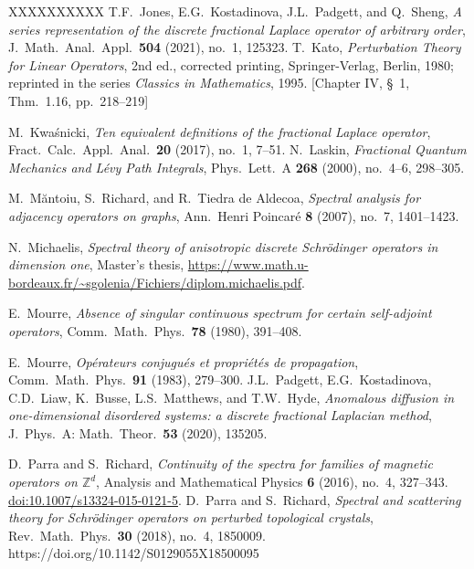 \documentclass[10pt]{amsart} %
\newcommand{\1}{{\mathbb{I}}}
\numberwithin{equation}{section}
\begin{document}
\begin{thebibliography}{XXXXXXXXXX}
 T.F.\ Jones, E.G.\ Kostadinova, J.L.\ Padgett, and Q.\ Sheng, \emph{A series representation of the discrete fractional Laplace operator of arbitrary order}, J.\ Math.\ Anal.\ Appl.\ {\bf 504} (2021), no.\ 1, 125323.
T.~Kato, \emph{Perturbation Theory for Linear Operators}, 2nd ed., corrected printing,
Springer-Verlag, Berlin, 1980; reprinted in the series \emph{Classics in Mathematics}, 1995.
[Chapter IV, \S~1, Thm.~1.16, pp.~218--219]

 M.\ Kwa\'{s}nicki, \emph{Ten equivalent definitions of the fractional Laplace operator}, Fract.\ Calc.\ Appl.\ Anal.\ {\bf 20} (2017), no.\ 1, 7--51.
 N.\ Laskin, \emph{Fractional Quantum Mechanics and L\'evy Path Integrals}, Phys.\ Lett.\ A {\bf 268} (2000), no.\ 4--6, 298--305.

 M.\ M\u{a}ntoiu, S.\ Richard, and R.\ Tiedra de Aldecoa, \emph{Spectral analysis for adjacency operators on graphs}, Ann.\ Henri Poincar\'e {\bf 8} (2007), no.\ 7, 1401--1423.

 N.\ Michaelis, \emph{Spectral theory of anisotropic discrete Schr\"odinger operators in dimension one}, Master's thesis, \url{https://www.math.u-bordeaux.fr/~sgolenia/Fichiers/diplom.michaelis.pdf}.

 E.\ Mourre, \emph{Absence of singular continuous spectrum for certain self-adjoint operators}, Comm.\ Math.\ Phys.\ {\bf 78} (1980), 391--408.

 E.\ Mourre, \emph{Op\'erateurs conjugu\'es et propri\'et\'es de propagation}, Comm.\ Math.\ Phys.\ {\bf 91} (1983), 279--300.
 J.L.\ Padgett, E.G.\ Kostadinova, C.D.\ Liaw, K.\ Busse, L.S.\ Matthews, and T.W.\ Hyde, \emph{Anomalous diffusion in
    one-dimensional disordered systems: a discrete fractional Laplacian method}, J.\ Phys.\ A: Math.\ Theor.\ {\bf 53} (2020), 135205.


D.~Parra and S.~Richard,
\emph{Continuity of the spectra for families of magnetic operators on $\mathbb{Z}^d$},
Analysis and Mathematical Physics \textbf{6} (2016), no.~4, 327--343.
\href{https://doi.org/10.1007/s13324-015-0121-5}{doi:10.1007/s13324-015-0121-5}.
 D.\ Parra and S.\ Richard, \emph{Spectral and scattering theory for Schr\"odinger operators on perturbed topological crystals}, Rev.\ Math.\ Phys.\ {\bf 30} (2018), no.\ 4, 1850009. https://doi.org/10.1142/S0129055X18500095


\end{thebibliography}
\end{document}
